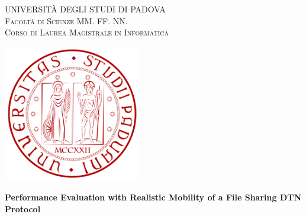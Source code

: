 
\begin{titlepage}
    \begin{center}
        {\Large UNIVERSITÀ DEGLI STUDI DI PADOVA}\\
        \vspace{0.2cm}                                                  %
        {\Large \scshape Facoltà di Scienze MM. FF. NN.}\\
        \vspace{2mm}
        {\Large \scshape Corso di Laurea Magistrale in Informatica}\\
        \vspace{2mm}                                                      %
        
        \vspace{0.3cm}
        \includegraphics[width=6cm]{figure/unipd_logo}\\
        \vspace{2cm}
        
        \vspace{2cm}
        {\LARGE \bfseries Performance Evaluation with Realistic Mobility of a File Sharing DTN Protocol} \\
        \vspace{2.5cm}
    \end{center}


\end{titlepage}
